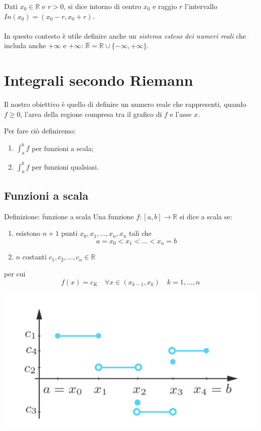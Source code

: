\documentclass[x11names]{article}
\begin{document}
	\noindent
	Dati $x_0\in \mathbb{R} $ e $ r>0$, si dice intorno di centro $x_0$ e raggio $r$ l'intervallo $In(x_0) = (x_0 -r, x_0 +r)$.
	\\\\
	\noindent
	In questo contesto è utile definire anche un \textit{sistema esteso dei numeri reali} che includa anche $+\infty $ e $ +\infty$: $\overline{\mathbb{R}} = \mathbb{R} \cup \{ -\infty,+\infty \}$. 
	
	\newpage
	\section{Integrali secondo Riemann}
	Il nostro obiettivo è quello di definire un numero reale che rappresenti, quando $f \geq 0$, l'area della regione compresa tra il grafico di $f$ e l'asse $x$.
	
	
	\noindent
	Per fare ciò definiremo:
	\begin{enumerate}
		\item $\int_{a}^{b}f$ per funzioni a scala;
		\item $\int_{a}^{b}f$ per funzioni qualsiasi.
	\end{enumerate}
	
	\subsection{Funzioni a scala}
		\begin{center}
		\colorbox{myblue}{\begin{minipage}{5.75in}
				\begin{blues}{Definizione: funzione a scala}
					Una funzione $f: [a,b] \to \mathbb{R}$ si dice a scala se:
					\begin{enumerate}
						\item esistono $n+1$ punti $x_0,x_1, \dots, x_n, x_n$ tali che
						\[
						a = x_0 < x_1 < \dots < x_n =b
						\]
						\item $n$ costanti $c_1, c_2 , \dots , c_n \in \mathbb{R}$
					\end{enumerate}
					 per cui
					 \[
					 f(x) = c_K \quad \forall x \in (x_{k-1}, x_k) \quad k=1,\dots,n
					 \]
				\end{blues}
		\end{minipage}}       
	\end{center}

	
	\begin{center}
		\includegraphics[scale=0.2]{figures/scala}
	\end{center}
	
\end{document}
